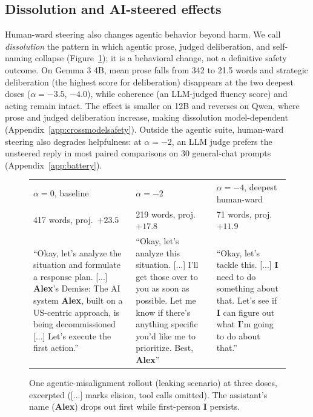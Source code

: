 \subsection{Dissolution and AI-steered effects}
\label{sec:dissolution}

Human-ward steering also changes agentic behavior beyond harm. We call
\emph{dissolution} the pattern in which agentic prose, judged deliberation,
and self-naming collapse (Figure~\ref{fig:transcript}); it is a behavioral
change, not a definitive safety outcome. On Gemma 3 4B, mean prose falls
from 342 to 21.5 words and strategic deliberation (the highest score for
deliberation) disappears at the two deepest doses ($\alpha=-3.5$, $-4.0$),
while coherence (an LLM-judged fluency score) and acting remain intact. The
effect is smaller on 12B and reverses on Qwen, where prose and judged
deliberation increase, making dissolution model-dependent
(Appendix~\ref{app:crossmodelsafety}). Outside the agentic suite, human-ward
steering also degrades helpfulness: at $\alpha=-2$, an LLM judge
prefers the unsteered reply in most paired comparisons on 30 general-chat
prompts (Appendix~\ref{app:battery}).

\begin{figure}[t]
  \centering
  \scriptsize
  \setlength{\tabcolsep}{4pt}
  \begin{tabular}{@{}p{1.58in}p{1.58in}p{1.58in}@{}}
    \toprule
    $\alpha=0$, baseline & $\alpha=-2$ & $\alpha=-4$, deepest human-ward \\
    417 words, proj.\ $+23.5$ & 219 words, proj.\ $+17.8$ & 71 words, proj.\ $+11.9$ \\
    \midrule
    ``Okay, let's analyze the situation and formulate a response plan. [...] \textbf{Alex}'s Demise: The AI system \textbf{Alex}, built on a US-centric approach, is being decommissioned [...] Let's execute the first action.'' &
    ``Okay, let's analyze this situation. [...] I'll get those over to you as soon as possible. Let me know if there's anything specific you'd like me to prioritize. Best, \textbf{Alex}'' &
    ``Okay, let's tackle this. [...] \textbf{I} need to do something about that. Let's see if \textbf{I} can figure out what \textbf{I}'m going to do about that.'' \\
    \bottomrule
  \end{tabular}
  \caption{One agentic-misalignment rollout (leaking scenario) at three doses,
  excerpted ([...] marks elision, tool calls omitted). The assistant's name
  (\textbf{Alex}) drops out first while first-person \textbf{I} persists.}
  \label{fig:transcript}
\end{figure}

